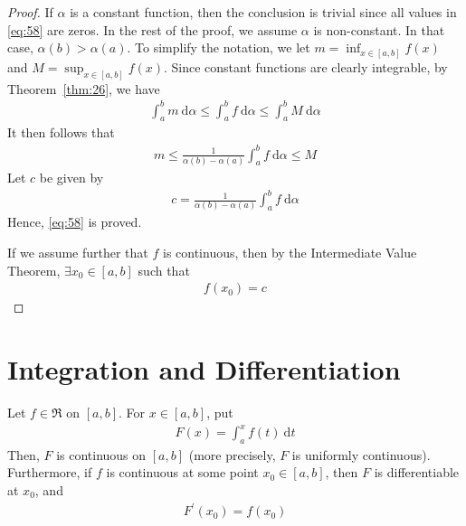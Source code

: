 \documentclass[thmcnt=section, 12pt]{elegantbook}
\begin{document}
\begin{proof}
    If $\alpha$ is a constant function, then the conclusion is trivial since all values in \eqref{eq:58} are zeros. In the rest of the proof, we assume $\alpha$ is non-constant. In that case, $\alpha(b) > \alpha(a)$. To simplify the notation, we let $m = \inf_{x \in [a, b]} f(x)$ and $M = \sup_{x \in [a, b]} f(x)$. Since constant functions are clearly integrable, by Theorem~\ref{thm:26}, we have 
    \begin{align*}
        \int_{a}^{b} m \ \mathrm{d}\alpha
        \leq \int_{a}^{b} f \ \mathrm{d}\alpha
        \leq \int_{a}^{b} M \ \mathrm{d}\alpha
    \end{align*}
    It then follows that 
    \begin{align*}
        m \leq \frac{1}{\alpha(b) - \alpha(a)} \int_{a}^{b} f \ \mathrm{d}\alpha \leq M
    \end{align*}
    Let $c$ be given by 
    \begin{align*}
        c = \frac{1}{\alpha(b) - \alpha(a)} \int_{a}^{b} f \ \mathrm{d}\alpha
    \end{align*}
    Hence, \eqref{eq:58} is proved.

    \par If we assume further that $f$ is continuous, then by the Intermediate Value Theorem, $\exists x_0 \in [a, b]$ such that
    \begin{align*}
        f(x_0) = c
    \end{align*}
\end{proof}


\begin{theorem} \label{thm:28}
\end{theorem}


\section{Integration and Differentiation}


\begin{theorem} \label{thm:3}
    Let $f \in \mathfrak{R}$ on $[a, b]$. For $x \in [a, b]$, put 
    \begin{align*}
        F(x) = \int_a^x f(t) \ \mathrm{d} t
    \end{align*}
    Then, $F$ is continuous on $[a, b]$ (more precisely, $F$  is uniformly continuous). Furthermore, if $f$ is continuous at some point $x_0 \in [a, b]$, then $F$ is differentiable at $x_0$, and 
    \begin{align*}
        F^\prime(x_0) = f(x_0)
    \end{align*}
\end{theorem}
\end{document}
